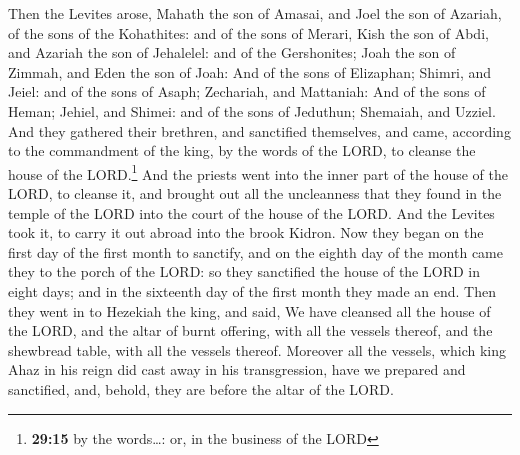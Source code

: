  Then the Levites arose, Mahath the son of Amasai, and
Joel the son of Azariah, of the sons of the Kohathites: and of the sons
of Merari, Kish the son of Abdi, and Azariah the son of Jehalelel: and
of the Gershonites; Joah the son of Zimmah, and Eden the son of Joah:
 And of the sons of Elizaphan; Shimri, and Jeiel: and of
the sons of Asaph; Zechariah, and Mattaniah:  And of the
sons of Heman; Jehiel, and Shimei: and of the sons of Jeduthun;
Shemaiah, and Uzziel.  And they gathered their brethren,
and sanctified themselves, and came, according to the commandment of the
king, by the words of the LORD, to cleanse the house of the
LORD.\footnote{\textbf{29:15} by the words\ldots: or, in the business of
  the LORD}  And the priests went into the inner part of
the house of the LORD, to cleanse it, and brought out all the
uncleanness that they found in the temple of the LORD into the court of
the house of the LORD. And the Levites took it, to carry it out abroad
into the brook Kidron.  Now they began on the first day
of the first month to sanctify, and on the eighth day of the month came
they to the porch of the LORD: so they sanctified the house of the LORD
in eight days; and in the sixteenth day of the first month they made an
end.  Then they went in to Hezekiah the king, and said,
We have cleansed all the house of the LORD, and the altar of burnt
offering, with all the vessels thereof, and the shewbread table, with
all the vessels thereof.  Moreover all the vessels, which
king Ahaz in his reign did cast away in his transgression, have we
prepared and sanctified, and, behold, they are before the altar of the
LORD.


